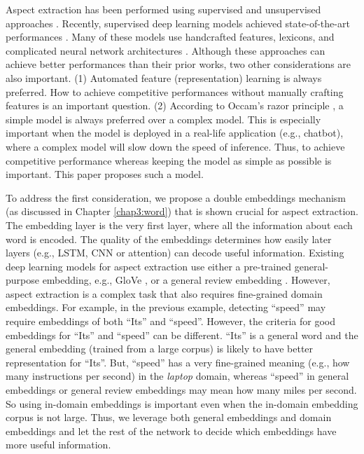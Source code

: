 Aspect extraction has been performed using supervised \cite{Jakob2010,chernyshevich2014ihs,shu2017lifelong} and unsupervised approaches \cite{HuL2004,ZhuangJZ2006,MeiLWSZ2007,QiuLBC2011,yin2016unsupervised,he2017unsupervised}. 
Recently, supervised deep learning models achieved state-of-the-art performances \cite{li2017deep}. Many of these models use handcrafted features, lexicons, and complicated neural network architectures \cite{poria2016aspect,wang2016recursive,wang2017coupled,li2017deep}. 
Although these approaches can achieve better performances than their prior works, two other considerations are also important.
(1) Automated feature (representation) learning is always preferred. 
How to achieve competitive performances without manually crafting features is an important question. 
(2) According to Occam's razor principle \cite{blumer1987occam}, a simple model is always preferred over a complex model.
This is especially important when the model is deployed in a real-life application (e.g., chatbot), where a complex model will slow down the speed of inference. Thus, to achieve competitive performance whereas keeping the model as simple as possible is important. This paper proposes such a model. 

To address the first consideration, we propose a double embeddings mechanism (as discussed in Chapter \ref{chap3:word}) that is shown crucial for aspect extraction.
The embedding layer is the very first layer, where all the information about each word is encoded.
The quality of the embeddings determines how easily later layers (e.g., LSTM, CNN or attention) can decode useful information.
Existing deep learning models for aspect extraction use either a pre-trained general-purpose embedding, e.g., GloVe \cite{pennington2014glove}, or a general review embedding \cite{poria2016aspect}.
However, aspect extraction is a complex task that also requires fine-grained domain embeddings.
For example, in the previous example, detecting ``speed'' may require embeddings of both ``Its'' and ``speed''.
However, the criteria for good embeddings for ``Its'' and ``speed'' can be different.
``Its'' is a general word and the general embedding (trained from a large corpus) is likely to have better representation for ``Its''.
But, ``speed'' has a very fine-grained meaning (e.g., how many instructions per second) in the \textit{laptop} domain, whereas ``speed'' in general embeddings or general review embeddings may mean how many miles per second.
So using in-domain embeddings is important even when the in-domain embedding corpus is not large. 
Thus, we leverage both general embeddings and domain embeddings and let the rest of the network to decide which embeddings have more useful information.

